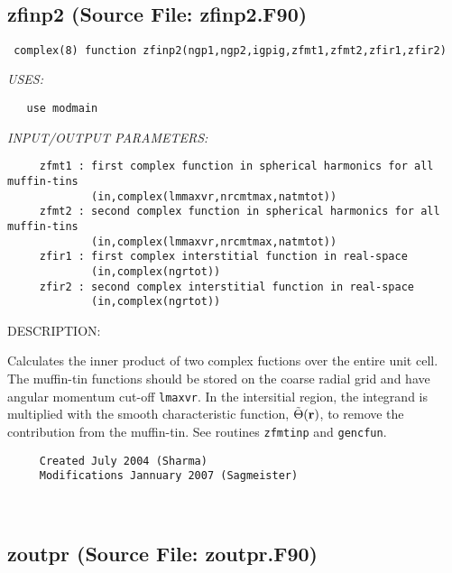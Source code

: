 \documentclass[11pt]{article}
\begin{document}
 
 
\mbox{}\hrulefill\ 
 
\subsection{zfinp2 (Source File: zfinp2.F90)}


\begin{verbatim} complex(8) function zfinp2(ngp1,ngp2,igpig,zfmt1,zfmt2,zfir1,zfir2)\end{verbatim}{\em USES:}
\begin{verbatim}   use modmain\end{verbatim}{\em INPUT/OUTPUT PARAMETERS:}
\begin{verbatim}     zfmt1 : first complex function in spherical harmonics for all muffin-tins
             (in,complex(lmmaxvr,nrcmtmax,natmtot))
     zfmt2 : second complex function in spherical harmonics for all muffin-tins
             (in,complex(lmmaxvr,nrcmtmax,natmtot))
     zfir1 : first complex interstitial function in real-space
             (in,complex(ngrtot))
     zfir2 : second complex interstitial function in real-space
             (in,complex(ngrtot))\end{verbatim}
{\sf DESCRIPTION:\\ }


     Calculates the inner product of two complex fuctions over the entire unit
     cell. The muffin-tin functions should be stored on the coarse radial grid
     and have angular momentum cut-off {\tt lmaxvr}. In the intersitial region,
     the integrand is multiplied with the smooth characteristic function,
     $\tilde{\Theta}({\bf r})$, to remove the contribution from the muffin-tin.
     See routines {\tt zfmtinp} and {\tt gencfun}.
  
\begin{verbatim}     Created July 2004 (Sharma)
     Modifications Jannuary 2007 (Sagmeister)\end{verbatim}


 
 
\mbox{}\hrulefill\ 
 
\subsection{zoutpr (Source File: zoutpr.F90)}
\end{document}

